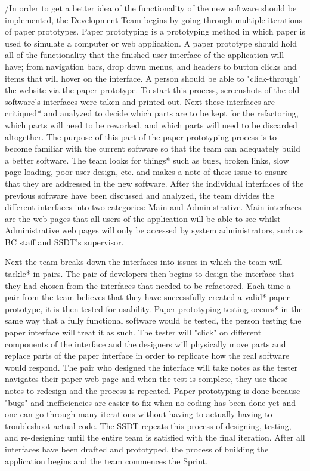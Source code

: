 /In order to get a better idea of the functionality of the new software should be implemented, the Development Team begins by going through multiple iterations of paper prototypes. Paper prototyping is a prototyping method in which paper is used to simulate a computer or web application. A paper prototype should hold all of the functionality that the finished user interface of the application will have; from navigation bars, drop down menus, and headers to button clicks and items that will hover on the interface. A person should be able to "click-through" the website via the paper prototype. To start this process, screenshots of the old software's interfaces were taken and printed out. Next these interfaces are critiqued* and analyzed to decide which parts are to be kept for the refactoring, which parts will need to be reworked, and which parts will need to be discarded altogether. The purpose of this part of the paper prototyping process is to become familiar with the current software so that the team can adequately build a better software. The team looks for things* such as bugs, broken links, slow page loading, poor user design, etc. and makes a note of these issue to ensure that they are addressed in the new software. After the individual interfaces of the previous software have been discussed and analyzed, the team divides the different interfaces into two categories: Main and Administrative. Main interfaces are the web pages that all users of the application will be able to see whilst Administrative web pages will only be accessed by system administrators, such as BC staff and SSDT's supervisor.


Next the team breaks down the interfaces into issues in which the team will tackle* in pairs. The pair of developers then begins to design the interface that they had chosen from the interfaces that needed to be refactored. Each time a pair from the team believes that they have successfully created a valid* paper prototype, it is then tested for usability. Paper prototyping testing occurs* in  the same way that a fully functional software would be tested, the person testing the paper interface will treat it as such. The tester will "click" on different components of the interface and the designers will physically move parts and replace parts of the paper interface in order to replicate how the real software would respond. The pair who designed the interface will take notes as the tester navigates their paper web page and when the test is complete, they use these notes to redesign and the process is repeated. Paper prototyping is done because "bugs" and inefficiencies are easier to fix when no coding has been done yet and one can go through many iterations without having to actually having to troubleshoot actual code. The SSDT repeats this process of designing, testing, and re-designing until the entire team is satisfied with the final iteration. After all interfaces have been drafted and prototyped, the process of building the application begins and the team commences the Sprint.


